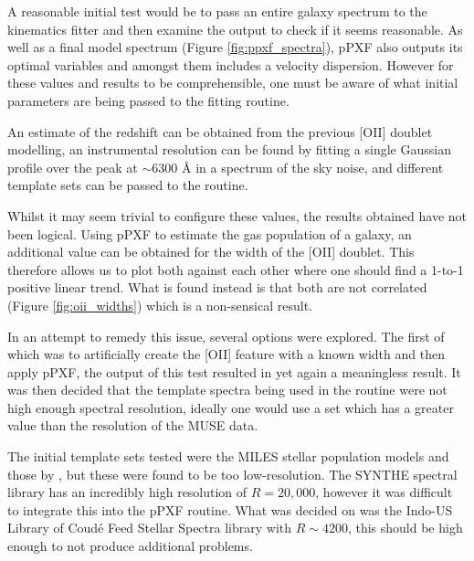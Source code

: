 \documentclass[12pt, twocolumn]{revtex4-1}    %
\begin{document}
A reasonable initial test would be to pass an entire galaxy spectrum to the kinematics fitter and then examine the output to check if it seems reasonable. As well as a final model spectrum (Figure \ref{fig:ppxf_spectra}), pPXF also outputs its optimal variables and amongst them includes a velocity dispersion. However for these values and results to be comprehensible, one must be aware of what initial parameters are being passed to the fitting routine. 

An estimate of the redshift can be obtained from the previous [OII] doublet modelling, an instrumental resolution can be found by fitting a single Gaussian profile over the peak at $\sim6300$ {\AA} in a spectrum of the sky noise, and different template sets can be passed to the routine. 



Whilst it may seem trivial to configure these values, the results obtained have not been logical. Using pPXF to estimate the gas population of a galaxy, an additional value can be obtained for the width of the [OII] doublet. This therefore allows us to plot both against each other where one should find a 1-to-1 positive linear trend. What is found instead is that both are not correlated (Figure \ref{fig:oii_widths}) which is a non-sensical result. 

In an attempt to remedy this issue, several options were explored. The first of which was to artificially create the [OII] feature with a known width and then apply pPXF, the output of this test resulted in yet again a meaningless result. It was then decided that the template spectra being used in the routine were not high enough spectral resolution, ideally one would use a set which has a greater value than the resolution of the MUSE data. 


The initial template sets tested were the MILES stellar population models \citep{vazdekis_miles} and those by \cite{jacoby_spectra}, but these were found to be too low-resolution. The SYNTHE spectral library \citep{munari_synthe} has an incredibly high resolution of $R=20,000$, however it was difficult to integrate this into the pPXF routine. What was decided on was the Indo-US Library of Coud{\'e} Feed Stellar Spectra \citep{valdes_coude} library with $R\sim4200$, this should be high enough to not produce additional problems.
\end{document}
